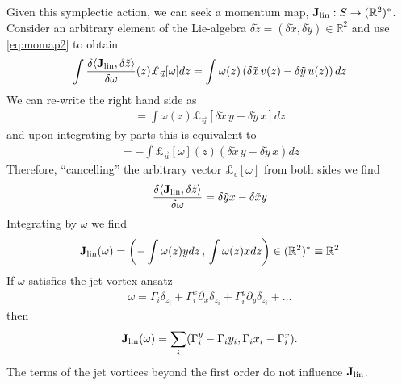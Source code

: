 \documentclass[12pt]{amsart}
\theoremstyle{remark}
\begin{document}
Given this symplectic action, we can seek a momentum map, ${\bf J}_{\rm lin}:S \to (\mathbb{R}^2)^*$.  Consider an arbitrary element of the Lie-algebra $\delta \tilde{z}  = (\delta \tilde{x}, \delta \tilde{y}) \in \mathbb{R}^2$ and use \eqref{eq:momap2} to obtain
\begin{align*}
  \int \frac{\delta \langle {\bf J}_{\rm lin} , \delta \tilde{z} \rangle}{\delta \omega}(z)   \pounds_{\vec{u}}[\omega] dz
  = \int \omega(z) \left( \delta \tilde{x} \, v(z) - \delta \tilde{y} \, u(z) \right) dz
\end{align*}
We can re-write the right hand side as
\begin{align*}
  = \int \omega(z)  \pounds_{\vec{u}} [ \delta \tilde{x} \, y - \delta \tilde{y} \, x] dz
\end{align*}
and upon integrating by parts this is equivalent to
\begin{align*}
  = - \int \pounds_{\vec{u}}[\omega](z)  \left( \delta \tilde{x}\, y - \delta \tilde{y}\, x \right) dz
\end{align*}
Therefore, ``cancelling'' the arbitrary vector $\pounds_v[\omega]$ from both sides we find
\begin{align*}
  \frac{\delta  \langle {\bf J}_{\rm lin} , \delta \tilde{z} \rangle}{\delta \omega} = \delta \tilde{y} x - \delta \tilde{x} y
\end{align*}
Integrating by $\omega$ we find
\begin{align*}
    {\bf J}_{\rm lin}(\omega) = \left( -\int \omega(z) y dz \, , \, \int \omega(z) x dz \right) \in (\mathbb{R}^2)^* \equiv \mathbb{R}^2
\end{align*}
If $\omega$ satisfies the jet vortex ansatz
\begin{align*}
  \omega = \Gamma_i \delta_{z_i} + \Gamma_i^x \partial_x \delta_{z_i} + \Gamma_i^y \partial_y \delta_{z_i} + \dots
\end{align*}
then
\begin{align*}
  {\bf J}_{\rm lin}(\omega) = \sum_i ( \Gamma_i^{y} - \Gamma_i y_i , \Gamma_i x_i -\Gamma_i^{x} ).
\end{align*}
The terms of the jet vortices beyond the first order do not influence ${\bf J}_{\rm lin}$.
\end{document}
